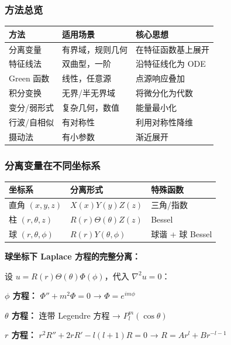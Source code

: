 \subsubsection{方法总览}

\begin{center}
\begin{tabular}{L{3cm}L{4cm}L{4cm}}
\toprule
\textbf{方法} & \textbf{适用场景} & \textbf{核心思想} \\
\midrule
分离变量 & 有界域，规则几何 & 在特征函数基上展开 \\
特征线法 & 双曲型，一阶 & 沿特征线化为 ODE \\
Green 函数 & 线性，任意源 & 点源响应叠加 \\
积分变换 & 无界/半无界域 & 将微分化为代数 \\
变分/弱形式 & 复杂几何，数值 & 能量最小化 \\
行波/自相似 & 有对称性 & 利用对称性降维 \\
摄动法 & 有小参数 & 渐近展开 \\
\bottomrule
\end{tabular}
\end{center}

\subsubsection{分离变量在不同坐标系}

\begin{center}
\begin{tabular}{L{3cm}L{3.5cm}L{4cm}}
\toprule
\textbf{坐标系} & \textbf{分离形式} & \textbf{特殊函数} \\
\midrule
直角 $(x,y,z)$ & $X(x)Y(y)Z(z)$ & 三角/指数 \\
柱 $(r,\theta,z)$ & $R(r)\Theta(\theta)Z(z)$ & Bessel \\
球 $(r,\theta,\phi)$ & $R(r)Y(\theta,\phi)$ & 球谐 + 球 Bessel \\
\bottomrule
\end{tabular}
\end{center}

\textbf{球坐标下 Laplace 方程的完整分离：}

设 $u = R(r)\Theta(\theta)\Phi(\phi)$，代入 $\nabla^2 u = 0$：

\textbf{$\phi$ 方程：} $\Phi'' + m^2\Phi = 0$ → $\Phi = e^{im\phi}$

\textbf{$\theta$ 方程：} 连带 Legendre 方程 → $P_l^m(\cos\theta)$

\textbf{$r$ 方程：} $r^2 R'' + 2rR' - l(l+1)R = 0$ → $R = Ar^l + Br^{-l-1}$

